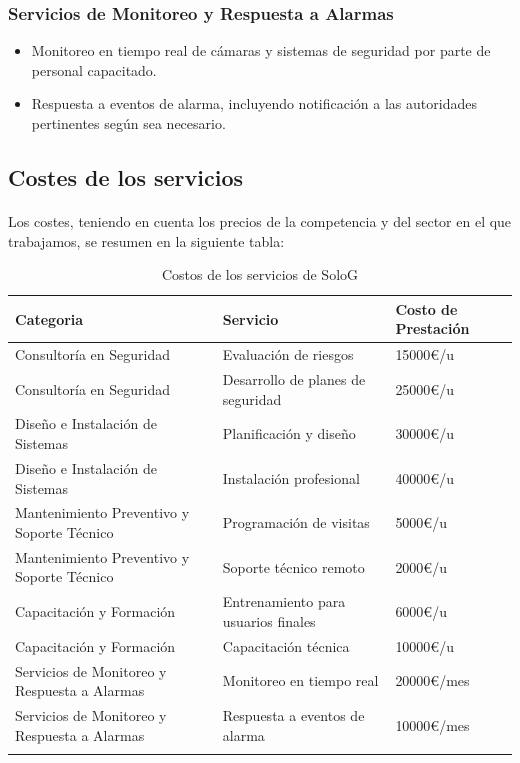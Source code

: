 \documentclass{report}
\begin{document}
            \subsubsection*{Servicios de Monitoreo y Respuesta a Alarmas}
              \begin{itemize}
                \item Monitoreo en tiempo real de cámaras y sistemas de seguridad por parte de personal capacitado.
                \item Respuesta a eventos de alarma, incluyendo notificación a las autoridades pertinentes según sea necesario.
              \end{itemize}
          \clearpage\subsection{Costes de los servicios}
            \paragraph*{}
            {
              Los costes, teniendo en cuenta los precios de la competencia y del sector en el que trabajamos, se resumen en la siguiente tabla:
            }
            \begin{longtable}{|p{5cm}|p{5cm}|p{5cm}|}
              \hline
              \textbf{Categoria} & \textbf{Servicio} & \textbf{Costo de Prestación}\\
              \hline
              \hline
              Consultoría en Seguridad & Evaluación de riesgos & 15000€/u\\
              \hline
              Consultoría en Seguridad & Desarrollo de planes de seguridad & 25000€/u\\
              \hline
              Diseño e Instalación de Sistemas & Planificación y diseño & 30000€/u\\
              \hline
              Diseño e Instalación de Sistemas & Instalación profesional & 40000€/u\\
              \hline
              Mantenimiento Preventivo y Soporte Técnico & Programación de visitas & 5000€/u\\
              \hline
              Mantenimiento Preventivo y Soporte Técnico & Soporte técnico remoto & 2000€/u\\
              \hline
              Capacitación y Formación & Entrenamiento para usuarios finales & 6000€/u\\
              \hline
              Capacitación y Formación & Capacitación técnica & 10000€/u\\
              \hline
              Servicios de Monitoreo y Respuesta a Alarmas & Monitoreo en tiempo real & 20000€/mes\\
              \hline
              Servicios de Monitoreo y Respuesta a Alarmas & Respuesta a eventos de alarma & 10000€/mes\\
              \hline
              \caption{Costos de los servicios de SoloG}
            \end{longtable}
\end{document}
